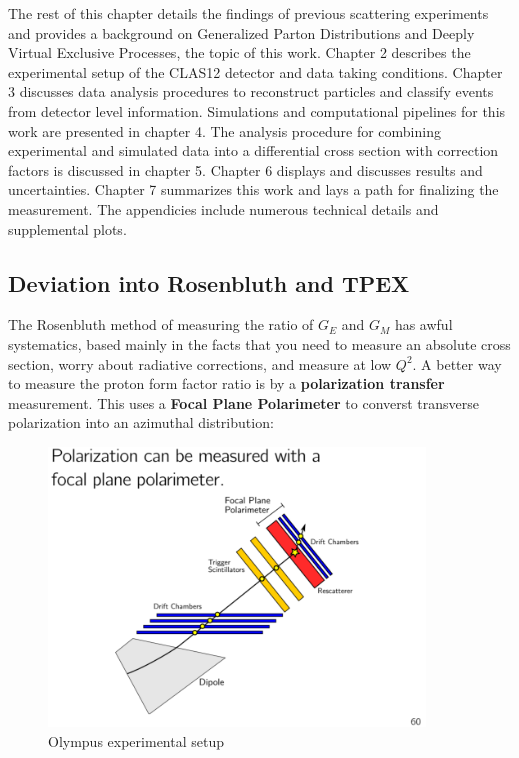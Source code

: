 The rest of this chapter details the findings of previous scattering experiments and provides a background on Generalized Parton Distributions and Deeply Virtual Exclusive Processes, the topic of this work. Chapter 2 describes the experimental setup of the CLAS12 detector and data taking conditions. Chapter 3 discusses data analysis procedures to reconstruct particles and classify events from detector level information. Simulations and computational pipelines for this work are presented in chapter 4. The analysis procedure for combining experimental and simulated data into a differential cross section with correction factors is discussed in chapter 5. Chapter 6 displays and discusses results and uncertainties. Chapter 7 summarizes this work and lays a path for finalizing the measurement. The appendicies include numerous technical details and supplemental plots. 


%


    \iffalse
         
        \subsection{Deviation into Rosenbluth and TPEX}
        
                
            The Rosenbluth method of measuring the ratio of $G_E$ and $G_M$ has awful systematics, based mainly in the facts that you need to measure an absolute cross section, worry about radiative corrections, and measure at low $Q^2$. A better way to measure the proton form factor ratio is by a \textbf{polarization transfer} measurement. This uses a \textbf{Focal Plane Polarimeter} to converst transverse polarization into an azimuthal distribution:
            
                  
            \begin{figure}[H]
                \centering
                \includegraphics[width=10cm]{Chapters/Ch1-Intro/Ch1-Sec1-Background/pics/elastic-ep/olympus-fpp.PNG}
                \caption{Olympus experimental setup}
            \end{figure}
            
